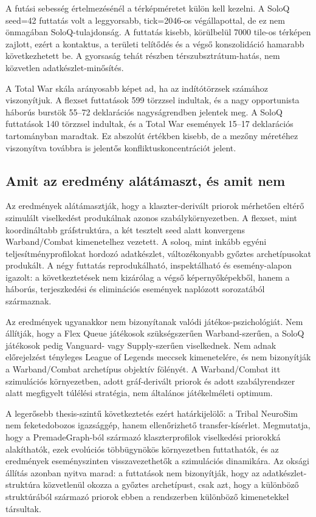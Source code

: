 ﻿\documentclass[a4paper,12pt]{report}
\begin{document}
A futási sebesség értelmezésénél a térképméretet külön kell kezelni. A SoloQ seed=42 futtatás volt a leggyorsabb, tick=2046-os végállapottal, de ez nem önmagában SoloQ-tulajdonság. A futtatás kisebb, körülbelül 7000 tile-os térképen zajlott, ezért a kontaktus, a területi telítődés és a végső konszolidáció hamarabb következhetett be. A gyorsaság tehát részben térszubsztrátum-hatás, nem közvetlen adatkészlet-minősítés.

A Total War skála arányosabb képet ad, ha az indítótörzsek számához viszonyítjuk. A flexset futtatások 599 törzzsel indultak, és a nagy opportunista háborús burstök 55--72 deklarációs nagyságrendben jelentek meg. A SoloQ futtatások 140 törzzsel indultak, és a Total War események 15--17 deklarációs tartományban maradtak. Ez abszolút értékben kisebb, de a mezőny méretéhez viszonyítva továbbra is jelentős konfliktuskoncentrációt jelent.

\subsection*{Amit az eredmény alátámaszt, és amit nem}

Az eredmények alátámasztják, hogy a klaszter-derivált priorok mérhetően eltérő szimulált viselkedést produkálnak azonos szabálykörnyezetben. A flexset, mint koordináltabb gráfstruktúra, a két tesztelt seed alatt konvergens Warband/Combat kimenetelhez vezetett. A soloq, mint inkább egyéni teljesítményprofilokat hordozó adatkészlet, változékonyabb győztes archetípusokat produkált. A négy futtatás reprodukálható, inspektálható és esemény-alapon igazolt: a következtetések nem kizárólag a végső képernyőképekből, hanem a háborús, terjeszkedési és eliminációs események naplózott sorozatából származnak.

Az eredmények ugyanakkor nem bizonyítanak valódi játékos-pszichológiát. Nem állítják, hogy a Flex Queue játékosok szükségszerűen Warband-szerűen, a SoloQ játékosok pedig Vanguard- vagy Supply-szerűen viselkednek. Nem adnak előrejelzést tényleges League of Legends meccsek kimenetelére, és nem bizonyítják a Warband/Combat archetípus objektív fölényét. A Warband/Combat itt szimulációs környezetben, adott gráf-derivált priorok és adott szabályrendszer alatt megfigyelt túlélési stratégia, nem általános játékelméleti optimum.

A legerősebb thesis-szintű következtetés ezért határkijelölő: a Tribal NeuroSim nem feketedobozos igazsággép, hanem ellenőrizhető transfer-kísérlet. Megmutatja, hogy a PremadeGraph-ból származó klaszterprofilok viselkedési priorokká alakíthatók, ezek evolúciós többügynökös környezetben futtathatók, és az eredmények eseményszinten visszavezethetők a szimulációs dinamikára. Az oksági állítás azonban nyitva marad: a futtatások nem bizonyítják, hogy az adatkészlet-struktúra közvetlenül okozza a győztes archetípust, csak azt, hogy a különböző struktúrából származó priorok ebben a rendszerben különböző kimenetekkel társultak.
\end{document}
